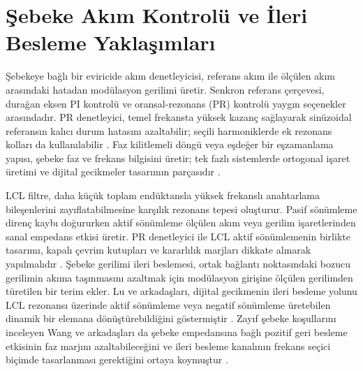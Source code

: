 
\section{Şebeke Akım Kontrolü ve İleri Besleme Yaklaşımları}

Şebekeye bağlı bir eviricide akım denetleyicisi, referans akım ile ölçülen akım arasındaki hatadan modülasyon gerilimi üretir. Senkron referans çerçevesi, durağan eksen PI kontrolü ve oransal-rezonans (PR) kontrolü yaygın seçenekler arasındadır. PR denetleyici, temel frekansta yüksek kazanç sağlayarak sinüzoidal referansın kalıcı durum hatasını azaltabilir; seçili harmoniklerde ek rezonans kolları da kullanılabilir \citep{Teodorescu2006PR,Teodorescu2011}. Faz kilitlemeli döngü veya eşdeğer bir eşzamanlama yapısı, şebeke faz ve frekans bilgisini üretir; tek fazlı sistemlerde ortogonal işaret üretimi ve dijital gecikmeler tasarımın parçasıdır \citep{Blaabjerg2006,Zhou2018}.

LCL filtre, daha küçük toplam endüktansla yüksek frekanslı anahtarlama bileşenlerini zayıflatabilmesine karşılık rezonans tepesi oluşturur. Pasif sönümleme direnç kaybı doğururken aktif sönümleme ölçülen akım veya gerilim işaretlerinden sanal empedans etkisi üretir. PR denetleyici ile LCL aktif sönümlemenin birlikte tasarımı, kapalı çevrim kutupları ve kararlılık marjları dikkate alınarak yapılmalıdır \citep{Zhang2014PR}. Şebeke gerilimi ileri beslemesi, ortak bağlantı noktasındaki bozucu gerilimin akıma taşınmasını azaltmak için modülasyon girişine ölçülen gerilimden türetilen bir terim ekler. Lu ve arkadaşları, dijital gecikmenin ileri besleme yolunu LCL rezonansı üzerinde aktif sönümleme veya negatif sönümleme üretebilen dinamik bir elemana dönüştürebildiğini göstermiştir \citep{Lu2016}. Zayıf şebeke koşullarını inceleyen Wang ve arkadaşları da şebeke empedansına bağlı pozitif geri besleme etkisinin faz marjını azaltabileceğini ve ileri besleme kanalının frekans seçici biçimde tasarlanması gerektiğini ortaya koymuştur \citep{Wang2024}.

